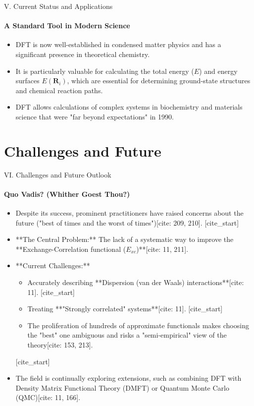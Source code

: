 \begin{frame}{\large V. Current Status and Applications}
    \framesubtitle{A Standard Tool in Modern Science}
    \begin{itemize}
        \item DFT is now well-established in condensed matter physics and has a significant presence in theoretical chemistry.
        \item It is particularly valuable for calculating the total energy ($E$) and energy surfaces $E(\mathbf{R}_i)$, which are essential for determining ground-state structures and chemical reaction paths.
        \item DFT allows calculations of complex systems in biochemistry and materials science that were "far beyond expectations" in 1990.
    \end{itemize}
\end{frame}

\section{Challenges and Future}

\begin{frame}{\large VI. Challenges and Future Outlook}
    \framesubtitle{Quo Vadis? (Whither Goest Thou?)}
    \begin{itemize}
        [cite_start]\item Despite its success, prominent practitioners have raised concerns about the future ("best of times and the worst of times")[cite: 209, 210].
        [cite_start]\item **The Central Problem:** The lack of a systematic way to improve the **Exchange-Correlation functional ($E_{xc}$)**[cite: 11, 211].
        \item **Current Challenges:**
        \begin{itemize}
            [cite_start]\item Accurately describing **Dispersion (van der Waals) interactions**[cite: 11].
            [cite_start]\item Treating **"Strongly correlated" systems**[cite: 11].
            [cite_start]\item The proliferation of hundreds of approximate functionals makes choosing the "best" one ambiguous and risks a "semi-empirical" view of the theory[cite: 153, 213].
        \end{itemize}
        [cite_start]\item The field is continually exploring extensions, such as combining DFT with Density Matrix Functional Theory (DMFT) or Quantum Monte Carlo (QMC)[cite: 11, 166].
    \end{itemize}
\end{frame}


